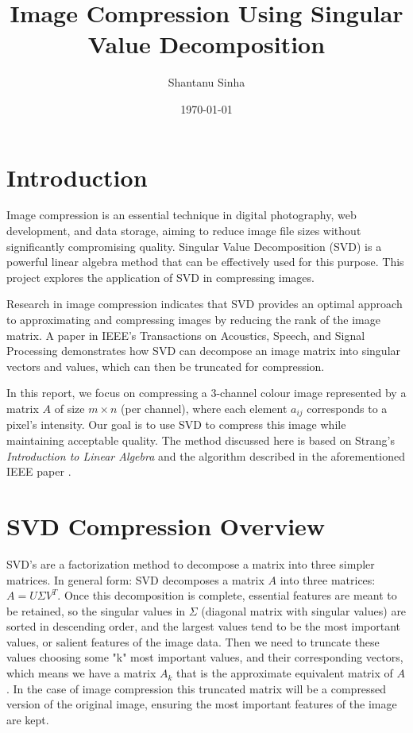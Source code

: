 \documentclass[12pt]{article}
\title{Image Compression Using Singular Value Decomposition}
\author{Shantanu Sinha}
\date{\today}
\begin{document}
\maketitle

\section{Introduction}

Image compression is an essential technique in digital photography, web development, and data storage, aiming to reduce image file sizes without significantly compromising quality. Singular Value Decomposition (SVD) is a powerful linear algebra method that can be effectively used for this purpose. This project explores the application of SVD in compressing images.

Research in image compression indicates that SVD provides an optimal approach to approximating and compressing images by reducing the rank of the image matrix. A paper in IEEE's Transactions on Acoustics, Speech, and Signal Processing \cite{IEEE_SVD} demonstrates how SVD can decompose an image matrix into singular vectors and values, which can then be truncated for compression.

In this report, we focus on compressing a 3-channel colour image represented by a matrix \(A\) of size \(m \times n\) (per channel), where each element \(a_{ij}\) corresponds to a pixel's intensity. Our goal is to use SVD to compress this image while maintaining acceptable quality. The method discussed here is based on Strang's \textit{Introduction to Linear Algebra} \cite{strang2006linear} and the algorithm described in the aforementioned IEEE paper \cite{IEEE_SVD}.




\section{SVD Compression Overview}
SVD's are a factorization method to decompose a matrix into three simpler matrices. In general form: SVD decomposes a matrix \(A\) into three matrices: \(A = U \Sigma V^T\). Once this decomposition is complete, essential features are meant to be retained, so the singular values in \(\Sigma\) (diagonal matrix with singular values) are sorted in descending order, and the largest values tend to be the most important values, or salient features of the image data. Then we need to truncate these values choosing some "k" most important values, and their corresponding vectors, which means we have a matrix \(A_k\) that is the approximate equivalent matrix of \(A\). In the case of image compression this truncated matrix will be a compressed version of the original image, ensuring the most important features of the image are kept.
\end{document}
